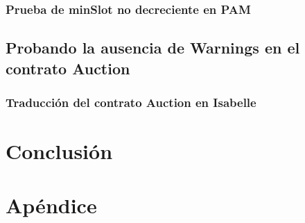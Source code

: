 \documentclass[12pt]{book}
\begin{document}
\subsection{Prueba de minSlot no decreciente en PAM}

\section{Probando la ausencia de Warnings en el contrato Auction}

\subsection{Traducción del contrato Auction en Isabelle}


\chapter{Conclusión}


\chapter{Apéndice}




\end{document}
